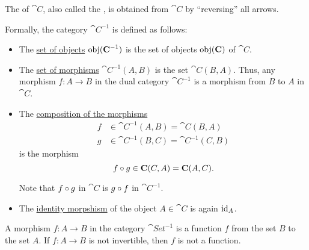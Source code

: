 \begin{definition}\label{def:dual_category}
  The  of \( \cat{C} \), also called the , is obtained from \( \cat{C} \) by \enquote{reversing} all arrows.

  Formally, the category \( \cat{C}^{-1} \) is defined as follows:
  \begin{itemize}
    \item The \hyperref[def:category/objects]{set of objects} \( \operatorname{obj}(\operatorname{\mathbf{C}}^{-1}) \) is the set of objects \( \operatorname{obj}(\operatorname{\mathbf{C}}) \) of \( \cat{C} \).

    \item The \hyperref[def:category/morphisms]{set of morphisms} \( \cat{C}^{-1}(A, B) \) is the set \( \cat{C}(B, A) \). Thus, any morphism \( f: A \to B \) in the dual category \( \cat{C}^{-1} \) is a morphism from \( B \) to \( A \) in \( \cat{C} \).

    \item The \hyperref[def:category/composition]{composition of the morphisms}
    \begin{align*}
      f &\in \cat{C}^{-1}(A, B) = \cat{C}(B, A) \\
      g &\in \cat{C}^{-1}(B, C) = \cat{C}^{-1}(C, B)
    \end{align*}
    is the morphism
    \begin{equation*}
      f \mathbin \circ g \in \operatorname{\mathbf{C}}(C, A) = \operatorname{\mathbf{C}}(A, C).
    \end{equation*}

    Note that \( f \mathbin \circ g \) in \( \cat{C} \) is \( g \mathbin \circ f \) in \( \cat{C}^{-1} \).

    \item The \hyperref[def:category/identity]{identity morpshism} of the object \( A \in \cat{C} \) is again \( \operatorname{id}_A \).
  \end{itemize}
\end{definition}

\begin{example}\label{ex:def:dual_category}
  A morphism \( f: A \to B \) in the category \( \cat{Set}^{-1} \) is a function \( f \) from the set \( B \) to the set \( A \). If \( f: A \to B \) is not invertible, then \( f \) is not a function.
\end{example}

